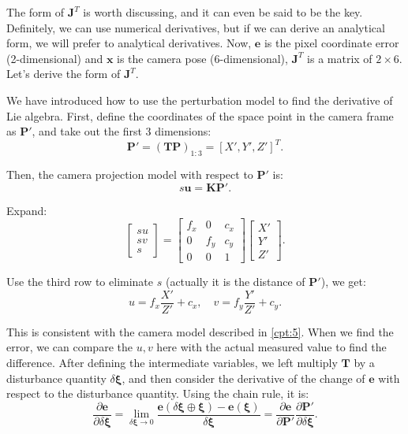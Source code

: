 The form of $\mathbf{J}^T$ is worth discussing, and it can even be said to be the key. Definitely, we can use numerical derivatives, but if we can derive an analytical form, we will prefer to analytical derivatives. Now, $\mathbf{e}$ is the pixel coordinate error (2-dimensional) and $\mathbf{x}$ is the camera pose (6-dimensional), $\mathbf{J}^T$ is a matrix of $2 \times 6$. Let's derive the form of $\mathbf{J}^T$.

We have introduced how to use the perturbation model to find the derivative of Lie algebra. First, define the coordinates of the space point in the camera frame as $\mathbf{P}'$, and take out the first 3 dimensions:
\begin{equation}
\mathbf{P}' = \left( \mathbf{T}{\mathbf{P}} \right)_{1:3}= [X', Y', Z']^T.
\end{equation}

Then, the camera projection model with respect to $\mathbf{P}'$ is:
\begin{equation}
s {\mathbf{u}} = \mathbf{K} \mathbf{P}'.
\end{equation}

Expand:
\begin{equation}
\left[ \begin{array}{l}
su\\
sv\\
s
\end{array} \right] = \left[ {\begin{array}{*{20}{c}}
	{{f_x}}&0&{{c_x}}\\
	0&{{f_y}}&{{c_y}}\\
	0&0&1
	\end{array}} \right]\left[ \begin{array}{l}
X'\\
Y'\\
Z'
\end{array} \right].
\end{equation}

Use the third row to eliminate $s$ (actually it is the distance of $\mathbf{P}'$), we get:
\begin{equation}
\label{eq:uv2xyz}
u = {f_x}\frac{{X'}}{{Z'}} + {c_x}, \quad v = {f_y}\frac{{Y'}}{{Z'}} + {c_y}.
\end{equation}

This is consistent with the camera model described in \ref{cpt:5}. When we find the error, we can compare the $u, v$ here with the actual measured value to find the difference. After defining the intermediate variables, we left multiply $\mathbf{T}$ by a disturbance quantity $\delta \boldsymbol{\xi}$, and then consider the derivative of the change of $\mathbf{e}$ with respect to the disturbance quantity. Using the chain rule, it is:
\begin{equation}
\frac{{\partial \mathbf{e}}}{{\partial \delta \boldsymbol{\xi} }} = \mathop {\lim }\limits_{\delta \boldsymbol{\xi}  \to 0} \frac{{\mathbf{e}\left( {\delta \boldsymbol{\xi}  \oplus \boldsymbol{\xi} } \right)-\mathbf{e}(\boldsymbol{\xi})}}{{\delta \boldsymbol{\xi} }}  = \frac{{\partial \mathbf{e}}}{{\partial \mathbf{P}'}}\frac{{\partial \mathbf{P}'}}{{\partial \delta \boldsymbol{\xi} }}.
\end{equation}

